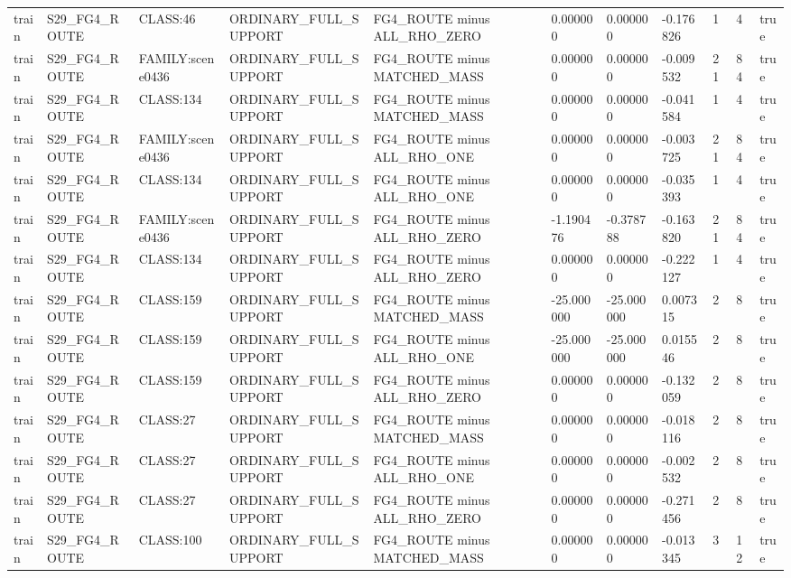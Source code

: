 \begin{tabular}{lllllllllll}
train & S29\_FG4\_ROUTE & CLASS:46 & ORDINARY\_FULL\_SUPPORT & FG4\_ROUTE minus ALL\_RHO\_ZERO & 0.000000 & 0.000000 & -0.176826 & 1 & 4 & true \\
train & S29\_FG4\_ROUTE & FAMILY:scene0436 & ORDINARY\_FULL\_SUPPORT & FG4\_ROUTE minus MATCHED\_MASS & 0.000000 & 0.000000 & -0.009532 & 21 & 84 & true \\
train & S29\_FG4\_ROUTE & CLASS:134 & ORDINARY\_FULL\_SUPPORT & FG4\_ROUTE minus MATCHED\_MASS & 0.000000 & 0.000000 & -0.041584 & 1 & 4 & true \\
train & S29\_FG4\_ROUTE & FAMILY:scene0436 & ORDINARY\_FULL\_SUPPORT & FG4\_ROUTE minus ALL\_RHO\_ONE & 0.000000 & 0.000000 & -0.003725 & 21 & 84 & true \\
train & S29\_FG4\_ROUTE & CLASS:134 & ORDINARY\_FULL\_SUPPORT & FG4\_ROUTE minus ALL\_RHO\_ONE & 0.000000 & 0.000000 & -0.035393 & 1 & 4 & true \\
train & S29\_FG4\_ROUTE & FAMILY:scene0436 & ORDINARY\_FULL\_SUPPORT & FG4\_ROUTE minus ALL\_RHO\_ZERO & -1.190476 & -0.378788 & -0.163820 & 21 & 84 & true \\
train & S29\_FG4\_ROUTE & CLASS:134 & ORDINARY\_FULL\_SUPPORT & FG4\_ROUTE minus ALL\_RHO\_ZERO & 0.000000 & 0.000000 & -0.222127 & 1 & 4 & true \\
train & S29\_FG4\_ROUTE & CLASS:159 & ORDINARY\_FULL\_SUPPORT & FG4\_ROUTE minus MATCHED\_MASS & -25.000000 & -25.000000 & 0.007315 & 2 & 8 & true \\
train & S29\_FG4\_ROUTE & CLASS:159 & ORDINARY\_FULL\_SUPPORT & FG4\_ROUTE minus ALL\_RHO\_ONE & -25.000000 & -25.000000 & 0.015546 & 2 & 8 & true \\
train & S29\_FG4\_ROUTE & CLASS:159 & ORDINARY\_FULL\_SUPPORT & FG4\_ROUTE minus ALL\_RHO\_ZERO & 0.000000 & 0.000000 & -0.132059 & 2 & 8 & true \\
train & S29\_FG4\_ROUTE & CLASS:27 & ORDINARY\_FULL\_SUPPORT & FG4\_ROUTE minus MATCHED\_MASS & 0.000000 & 0.000000 & -0.018116 & 2 & 8 & true \\
train & S29\_FG4\_ROUTE & CLASS:27 & ORDINARY\_FULL\_SUPPORT & FG4\_ROUTE minus ALL\_RHO\_ONE & 0.000000 & 0.000000 & -0.002532 & 2 & 8 & true \\
train & S29\_FG4\_ROUTE & CLASS:27 & ORDINARY\_FULL\_SUPPORT & FG4\_ROUTE minus ALL\_RHO\_ZERO & 0.000000 & 0.000000 & -0.271456 & 2 & 8 & true \\
train & S29\_FG4\_ROUTE & CLASS:100 & ORDINARY\_FULL\_SUPPORT & FG4\_ROUTE minus MATCHED\_MASS & 0.000000 & 0.000000 & -0.013345 & 3 & 12 & true \\

\end{tabular}
